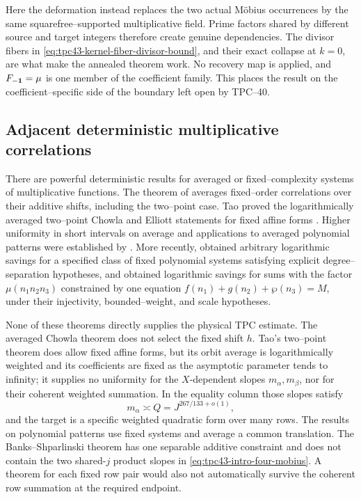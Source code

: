 Here the deformation instead replaces the two actual M\"obius occurrences
by the same squarefree--supported multiplicative field.  Prime factors
shared by different source and target integers therefore create genuine
dependencies.  The divisor fibers in
\eqref{eq:tpc43-kernel-fiber-divisor-bound}, and their exact collapse at
\(k=0\), are what make the annealed theorem work.  No recovery map is
applied, and \(F_{-\mathbf 1}=\mu\) is one member of the coefficient family.
This places the result on the coefficient--specific side of the boundary
left open by TPC--40.

\subsection{Adjacent deterministic multiplicative correlations}

There are powerful deterministic results for averaged or fixed--complexity
systems of multiplicative functions.  The theorem of
\citet{MatomakiRadziwillTao2015} averages fixed--order correlations over
their additive shifts, including the two--point case.  Tao proved the
logarithmically averaged two--point Chowla and Elliott statements for
fixed affine forms \citep{Tao2016}.  Higher uniformity in short intervals
on average and applications to averaged polynomial patterns were
established by \citet{MRTTZ2023}.  More recently,
\citet{MatthiesenTeravainenWang2026} obtained arbitrary logarithmic
savings for a specified class of fixed polynomial systems satisfying
explicit degree--separation hypotheses, and
\citet{BanksShparlinski2026} obtained logarithmic savings for sums with
the factor \(\mu(n_1n_2n_3)\) constrained by one equation
\(f(n_1)+g(n_2)+\wp(n_3)=M\), under their injectivity, bounded--weight,
and scale hypotheses.

None of these theorems directly supplies the physical TPC estimate.
The averaged Chowla theorem does not select the fixed shift \(h\).
Tao's two--point theorem does allow fixed affine forms, but its orbit
average is logarithmically weighted and its coefficients are fixed as
the asymptotic parameter tends to infinity; it supplies no uniformity
for the \(X\)-dependent slopes \(m_\alpha,m_\beta\), nor for their
coherent weighted summation.  In the equality column those slopes satisfy
\begin{equation}
 m_\alpha\asymp Q
 =J^{267/133+o(1)},
 \label{eq:tpc43-moving-slope-size}
\end{equation}
and the target is a specific weighted quadratic form over many rows.
The results on polynomial patterns use fixed systems and average a
common translation.  The Banks--Shparlinski theorem has one separable
additive constraint and does not contain the two shared-\(j\) product
slopes in \eqref{eq:tpc43-intro-four-mobius}.  A theorem for each fixed
row pair would also not automatically survive the coherent row summation
at the required endpoint.

